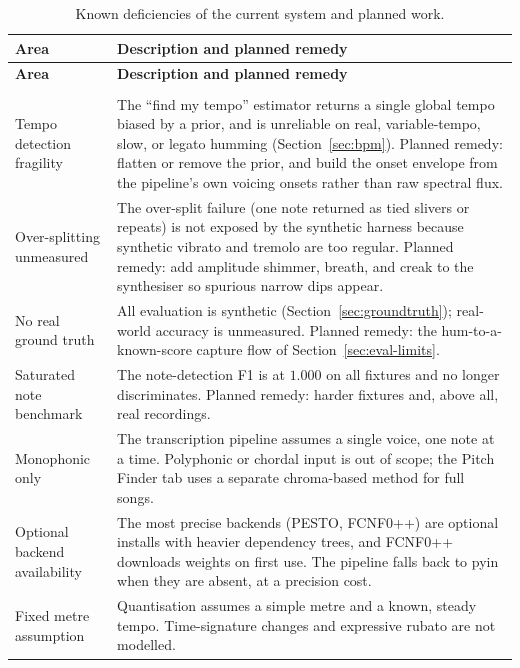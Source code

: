 \documentclass[12pt,a4paper]{article}
\begin{document}
\begin{longtable}{>{\raggedright\arraybackslash}p{} >{\raggedright\arraybackslash}p{}}
\caption{Known deficiencies of the current system and planned work.}
\label{tab:deficiencies} \\
\toprule
\textbf{Area} & \textbf{Description and planned remedy} \\
\midrule
\endfirsthead
\toprule
\textbf{Area} & \textbf{Description and planned remedy} \\
\midrule
\endhead
\midrule
\multicolumn{2}{r}{\footnotesize\itshape Continued on the next page.} \\
\endfoot
\bottomrule
\endlastfoot
Tempo detection fragility & The ``find my tempo'' estimator returns a single
global tempo biased by a prior, and is unreliable on real, variable-tempo,
slow, or legato humming (Section~\ref{sec:bpm}). Planned remedy: flatten or
remove the prior, and build the onset envelope from the pipeline's own voicing
onsets rather than raw spectral flux. \\
\addlinespace
Over-splitting unmeasured & The over-split failure (one note returned as tied
slivers or repeats) is not exposed by the synthetic harness because synthetic
vibrato and tremolo are too regular. Planned remedy: add amplitude shimmer,
breath, and creak to the synthesiser so spurious narrow dips appear. \\
\addlinespace
No real ground truth & All evaluation is synthetic
(Section~\ref{sec:groundtruth}); real-world accuracy is unmeasured. Planned
remedy: the hum-to-a-known-score capture flow of
Section~\ref{sec:eval-limits}. \\
\addlinespace
Saturated note benchmark & The note-detection F1 is at $1.000$ on all fixtures
and no longer discriminates. Planned remedy: harder fixtures and, above all,
real recordings. \\
\addlinespace
Monophonic only & The transcription pipeline assumes a single voice, one note
at a time. Polyphonic or chordal input is out of scope; the Pitch Finder tab
uses a separate chroma-based method for full songs. \\
\addlinespace
Optional backend availability & The most precise backends (PESTO, FCNF0++) are
optional installs with heavier dependency trees, and FCNF0++ downloads weights
on first use. The pipeline falls back to pyin when they are absent, at a
precision cost. \\
\addlinespace
Fixed metre assumption & Quantisation assumes a simple metre and a known,
steady tempo. Time-signature changes and expressive rubato are not modelled. \\
\end{longtable}
\end{document}
